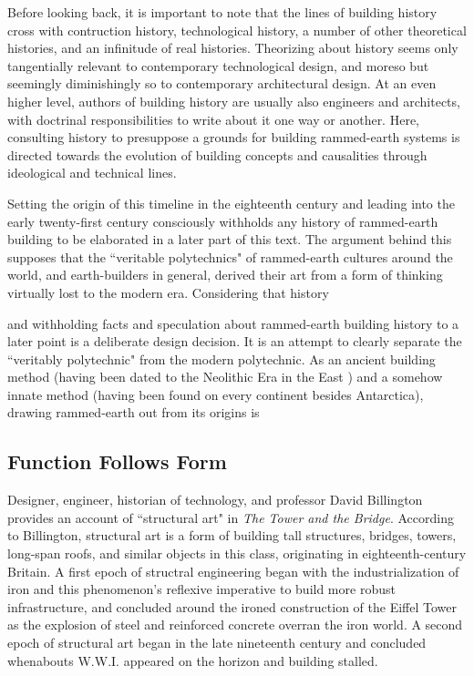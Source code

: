 Before looking back, it is important to note that the lines of building history cross with contruction history, technological history, a number of other theoretical histories, and an infinitude of real histories. Theorizing about history seems only tangentially relevant to contemporary technological design, and moreso but seemingly diminishingly so to contemporary architectural design. At an even higher level, authors of building history are usually also engineers and architects, with doctrinal responsibilities to write about it one way or another. \cite[p14]{CONSHISTORY} Here, consulting history to presuppose a grounds for building rammed-earth systems is directed towards the evolution of building concepts and causalities through ideological and technical lines.

Setting the origin of this timeline in the eighteenth century and leading into the early twenty-first century consciously withholds any history of rammed-earth building to be elaborated in a later part of this text. The argument behind this supposes that the ``veritable polytechnics" of rammed-earth cultures around the world, and earth-builders in general, derived their art from a form of thinking virtually lost to the modern era. Considering that history

and withholding facts and speculation about rammed-earth building history to a later point is a deliberate design decision. It is an attempt to clearly separate the ``veritably polytechnic" from the modern polytechnic. As an ancient building method (having been dated to the Neolithic Era in the East \cite{CHINESEARCHITECTURE}) and a somehow innate method (having been found on every continent besides Antarctica), drawing rammed-earth out from its origins is


\clearpage

\subsection{Function Follows Form}

Designer, engineer, historian of technology, and professor David Billington provides an account of ``structural art" in \textit{The Tower and the Bridge}. According to Billington, structural art is a form of building tall structures, bridges, towers, long-span roofs, and similar objects in this class, originating in eighteenth-century Britain. A first epoch of structral engineering began with the industrialization of iron and this phenomenon's reflexive imperative to build more robust infrastructure, and concluded around the ironed construction of the Eiffel Tower as the explosion of steel and reinforced concrete overran the iron world. A second epoch of structural art began in the late nineteenth century and concluded whenabouts W.W.I. appeared on the horizon and building stalled. \cite[p7]{TOWERANDBRIDGE}

